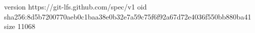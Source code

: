version https://git-lfs.github.com/spec/v1
oid sha256:8d5b7200770aeb0c1baa38e0b32e7a59c75f6f92a67d72e4036f550bb880ba41
size 11068
